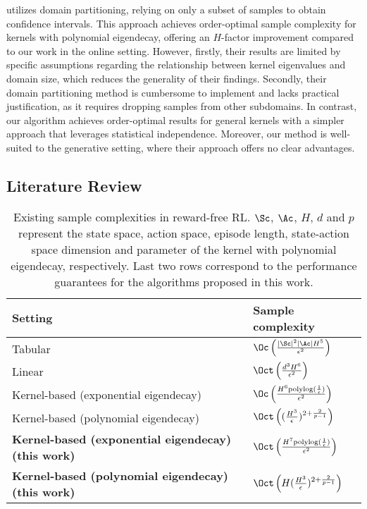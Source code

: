 \cite{vakilireward} utilizes domain partitioning, relying on only a subset of samples to obtain confidence intervals. This approach achieves order-optimal sample complexity for kernels with polynomial eigendecay, offering an $H$-factor improvement compared to our work in the online setting. However, firstly, their results are limited by specific assumptions regarding the relationship between kernel eigenvalues and domain size, which reduces the generality of their findings. Secondly, their domain partitioning method is cumbersome to implement and lacks practical justification, as it requires dropping samples from other subdomains. In contrast, our algorithm achieves order-optimal results for general kernels with a simpler approach that leverages statistical independence. Moreover, our method is well-suited to the generative setting, where their approach offers no clear advantages.

\subsection{Literature Review} \label{appx:lit_review}
\begin{table}[h]
\caption{Existing sample complexities in reward-free RL. $\Sc$, $\Ac$, $H$, $d$ and $p$ represent the state space, action space, episode length, state-action space dimension and parameter of the kernel with polynomial eigendecay, respectively. Last two rows correspond to the performance guarantees for the algorithms proposed in this work.\\ }
\label{samplecomplexitytable}
\centering
\begin{tabular}{ll}
\hline
Setting      & Sample complexity                                                           \\ \hline
Tabular \citep{jin2020reward}     & $\Oc\left(\frac{|\Sc|^2|\Ac| H^5}{\epsilon^2}\right)$                       \\
Linear \citep{wang2020reward}       & $\Oct\left(\frac{d^3 H^6}{\epsilon^2}\right)$                                \\
Kernel-based (exponential eigendecay)  \citep{qiu2021reward} & $\Oc\left(\frac{H^6 \text{polylog} (\frac{1}{\epsilon})}{\epsilon^2}\right)$ \\
Kernel-based (polynomial eigendecay) \citep{vakilireward} 
&$\Oct\left((\frac{H^3}{\epsilon})^{2+\frac{2}{p-1}}\right)$  \\ \hline
\textbf{Kernel-based (exponential eigendecay) (this work)} & $\Oct\left(\frac{H^7 \text{polylog} (\frac{1}{\epsilon})}{\epsilon^2}\right)$ \\ 
\textbf{Kernel-based (polynomial eigendecay) (this work) }
&$\Oct \left(H(\frac{H^3}{\epsilon})^{2+\frac{2}{p-1}}\right)$  \\ \hline
\end{tabular}
\end{table}

